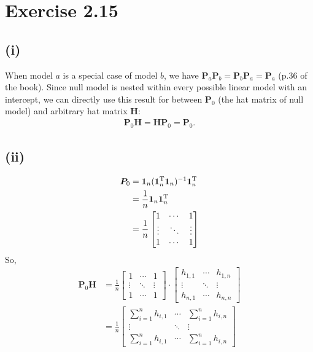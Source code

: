 \section*{Exercise 2.15}
\subsection*{(i)}
When model $a$ is a special case of model $b$, we have $\bm{P}_{a}\bm{P}_{b} = \bm{P}_{b}\bm{P}_{a} = \bm{P}_{a}$ (p.36 of the book). Since null model is nested within every possible linear model with an intercept, we can directly use this result for between $\bm{P}_{0}$ (the hat matrix of null model) and arbitrary hat matrix $\bm{H}$:
\begin{align*}
\bm{P}_{0}\bm{H} = \bm{H}\bm{P}_{0} = \bm{P}_{0}.
\end{align*}

\subsection*{(ii)}
\begin{align*}
\bm{P}_{0} &= \bm{1}_{n}(\bm{1}_{n}^{\rm T}\bm{1}_{n})^{-1}\bm{1}_{n}^{\rm T}\\
&= \frac{1}{n}\bm{1}_{n}\bm{1}_{n}^{\rm T}\\
&= 
\frac{1}{n}
\begin{bmatrix}
1 & \cdots & 1\\
\vdots & \ddots & \vdots\\
1 & \cdots & 1
\end{bmatrix}
\end{align*}
So, 
\begin{align*}
\bm{P}_{0}\bm{H}
&= 
\frac{1}{n}
\begin{bmatrix}
1 & \cdots & 1\\
\vdots & \ddots & \vdots\\
1 & \cdots & 1
\end{bmatrix}
\cdot
\begin{bmatrix}
h_{1,1} & \cdots & h_{1,n}\\
\vdots & \ddots & \vdots\\
h_{n,1} & \cdots & h_{n,n}
\end{bmatrix}
\\
&= 
\frac{1}{n}
\begin{bmatrix}
\sum_{i=1}^{n} h_{i,1} & \cdots & \sum_{i=1}^{n} h_{i,n}\\
\vdots & \ddots & \vdots\\
\sum_{i=1}^{n} h_{i,1} & \cdots & \sum_{i=1}^{n} h_{i,n}
\end{bmatrix}
\end{align*}

